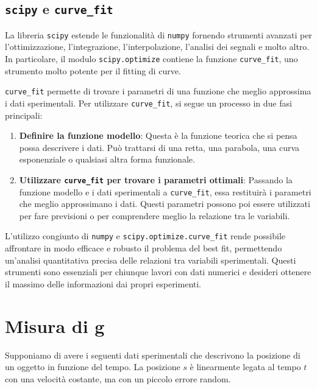 \documentclass[a4paper,12pt]{article}
\begin{document}
\subsection{\texorpdfstring{\texttt{scipy} e \texttt{curve\_fit}}{scipy e curve_fit}}

La libreria \texttt{scipy} estende le funzionalità di \texttt{numpy} fornendo strumenti avanzati per l'ottimizzazione, l'integrazione, l'interpolazione, l'analisi dei segnali e molto altro. In particolare, il modulo \texttt{scipy.optimize} contiene la funzione \texttt{curve\_fit}, uno strumento molto potente per il fitting di curve.

\texttt{curve\_fit} permette di trovare i parametri di una funzione che meglio approssima i dati sperimentali. Per utilizzare \texttt{curve\_fit}, si segue un processo in due fasi principali:

\begin{enumerate}
    \item \textbf{Definire la funzione modello}: Questa è la funzione teorica che si pensa possa descrivere i dati. Può trattarsi di una retta, una parabola, una curva esponenziale o qualsiasi altra forma funzionale.
    \item \textbf{Utilizzare \texttt{curve\_fit} per trovare i parametri ottimali}: Passando la funzione modello e i dati sperimentali a \texttt{curve\_fit}, essa restituirà i parametri che meglio approssimano i dati. Questi parametri possono poi essere utilizzati per fare previsioni o per comprendere meglio la relazione tra le variabili.
\end{enumerate}

L'utilizzo congiunto di \texttt{numpy} e \texttt{scipy.optimize.curve\_fit} rende possibile affrontare in modo efficace e robusto il problema del best fit, permettendo un'analisi quantitativa precisa delle relazioni tra variabili sperimentali. Questi strumenti sono essenziali per chiunque lavori con dati numerici e desideri ottenere il massimo delle informazioni dai propri esperimenti.




\section{Misura di g}
Supponiamo di avere i seguenti dati sperimentali che descrivono la posizione di un oggetto in funzione del tempo. La posizione \( s \) è linearmente legata al tempo \( t \) con una velocità costante, ma con un piccolo errore random.
\end{document}
